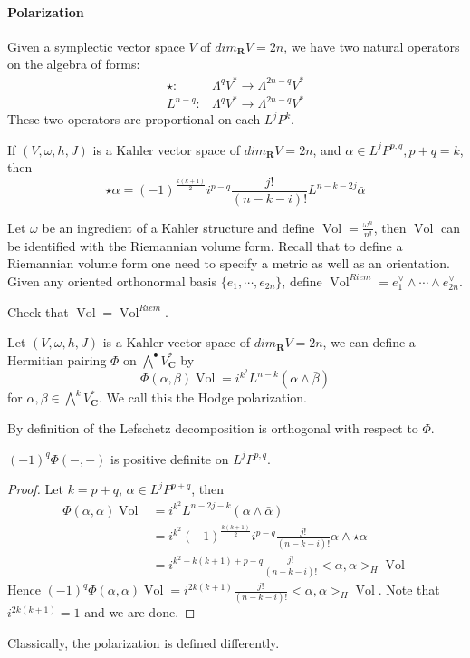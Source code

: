 \documentclass[
11pt, %
letterpaper， %
oneside, %
headinclude,footinclude, %
BCOR5mm, %
]{scrartcl}
\newcommand{\R}{{\mathbf{R}}}
\newcommand{\C}{{\mathbf{C}}}
\newcommand{\vol}{\operatorname{Vol}}
\begin{document}
\paragraph{Polarization}
Given a symplectic vector space $V$ of $dim_{\R} V=2n$, we have two natural operators on the algebra of forms:
\begin{align*}
\star: &\Lambda^{q}V^*\to \Lambda^{2n-q}V^*\\
L^{n-q} : &\Lambda^{q}V^*\to \Lambda^{2n-q}V^*
\end{align*}
These two operators are proportional on each $L^j P^k$.

\begin{prop}
	If $(V,\omega,h,J)$ is a Kahler vector space of $dim_{\R} V=2n$, and $\alpha \in L^{j} P^{p,q}, p+q=k$, then
	\begin{equation*}
	\star \alpha= (-1)^{\frac{k(k+1)}{2}}i^{p-q}\frac{j!}{(n-k-i)!}L^{n-k-2j}\bar{\alpha}
	\end{equation*}
\end{prop} 
Let $\omega$ be an ingredient of a Kahler structure and define $\vol=\frac{\omega^n}{n!}$, then $\vol$ can be identified with the Riemannian volume form. Recall that to define a Riemannian volume form one need to specify a metric as well as an orientation. Given any oriented orthonormal basis $\{e_1,\cdots, e_{2n} \}$, define $\vol^{Riem}=e_1^{\vee}\wedge\cdots \wedge e_{2n}^{\vee}$.
\begin{exercise}
	Check that $\vol=\vol^{Riem}$.
\end{exercise}

\begin{definition}
	Let $(V,\omega,h,J)$ is a Kahler vector space of $dim_{\R} V=2n$, we can define a Hermitian pairing $\Phi$ on $\bigwedge^{\bullet}V^*_{\C}$ by 
	\begin{equation*}
	\Phi(\alpha,\beta) \vol= i^{k^2} L^{n-k}( \alpha \wedge \bar{\beta})
	\end{equation*}
	for $\alpha, \beta \in \bigwedge^{k}V^*_{\C}$. We call this the Hodge polarization.
\end{definition}
By definition of the Lefschetz decomposition is orthogonal with respect to $\Phi$.

\begin{lem}
	$(-1)^q \Phi(-,-)$ is positive definite on $L^j P^{p,q}$.
\end{lem}
\begin{proof}
	Let $k=p+q$, $\alpha\in L^j P^{p+q}$, then
	\begin{align*}
	\Phi(\alpha, \alpha)\vol &=i^{k^2}L^{n-2j-k}(\alpha\wedge \bar{\alpha})\\
	&=i^{k^2}(-1)^{\frac{k(k+1)}{2}}i^{p-q}\frac{j!}{(n-k-i)!}\alpha\wedge \star \alpha\\
	&=i^{k^2+k(k+1)+p-q}\frac{j!}{(n-k-i)!}<\alpha,\alpha>_{H}\vol
	\end{align*}
	Hence $(-1)^q\Phi(\alpha, \alpha)\vol=i^{2k(k+1)}\frac{j!}{(n-k-i)!}<\alpha,\alpha>_{H}\vol$. Note that $i^{2k(k+1)}=1$ and we are done.
\end{proof}
Classically, the polarization is defined differently.
\end{document}
